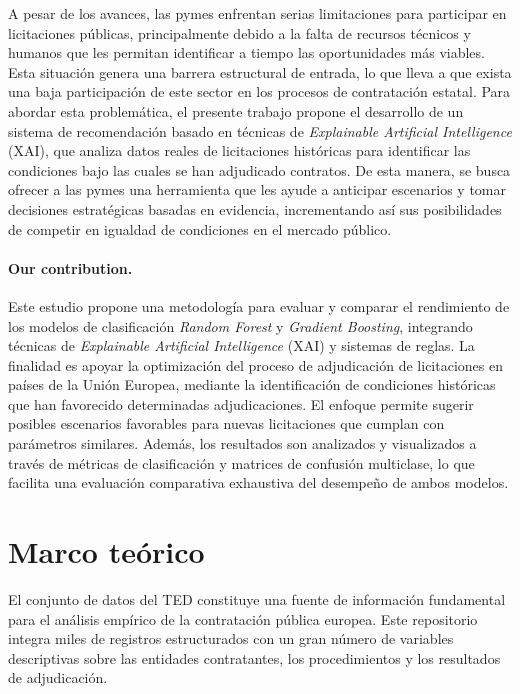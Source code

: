 \documentclass[a4paper,fleqn]{cas-sc}
\begin{document}
	A pesar de los avances, 
	las pymes enfrentan serias limitaciones para participar en licitaciones públicas, principalmente debido a la falta de recursos técnicos y humanos que les permitan identificar a tiempo las oportunidades más viables. 
	Esta situación genera una barrera estructural de entrada, lo que lleva a que exista una baja participación de este sector en los procesos de contratación estatal. 
	Para abordar esta problemática, el presente trabajo propone 
	el desarrollo de un sistema de recomendación basado en técnicas de \textit{Explainable Artificial Intelligence} (XAI), que analiza datos reales de licitaciones históricas para identificar las condiciones bajo las cuales se han adjudicado contratos. 
	De esta manera, se busca ofrecer a las pymes una herramienta que les ayude a anticipar escenarios y tomar decisiones estratégicas basadas en evidencia, incrementando así sus posibilidades de competir en igualdad de condiciones en el mercado público.

\paragraph{\bf Our contribution.}

Este estudio propone una metodología para evaluar y comparar el rendimiento de los modelos de clasificación \textit{Random Forest} y \textit{Gradient Boosting}, integrando técnicas de \textit{Explainable Artificial Intelligence} 
(XAI) y sistemas de reglas. La finalidad es apoyar la optimización del proceso de adjudicación de licitaciones en países de la Unión Europea, mediante la identificación de condiciones históricas que han favorecido determinadas adjudicaciones. El enfoque permite sugerir posibles escenarios favorables para nuevas licitaciones que cumplan con parámetros similares. Además, los resultados son analizados y visualizados a través de métricas de clasificación y matrices de confusión multiclase, lo que facilita una evaluación comparativa exhaustiva del desempeño de ambos modelos.


	\section{Marco teórico}
	
	El conjunto de datos del TED constituye una fuente de información fundamental para el análisis empírico de la contratación pública europea. 
	Este repositorio integra miles de registros estructurados con un gran número de variables descriptivas sobre las entidades contratantes, los procedimientos y los resultados de adjudicación. 
\end{document}
